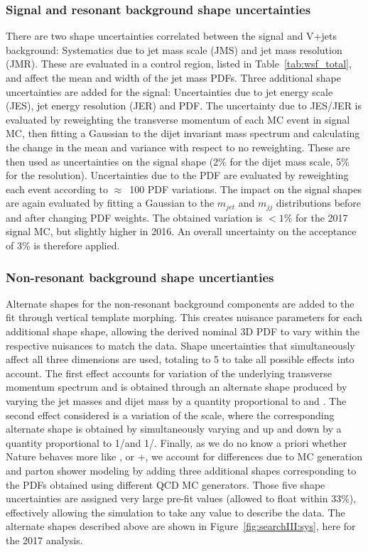 \subsubsection{Signal and resonant background shape uncertainties}
There are two shape uncertainties correlated between the signal and V+jets background: Systematics due to jet mass scale (JMS) and jet mass resolution (JMR). These are evaluated in a \ttbar control region, listed in Table~\ref{tab:wsf_total}, and affect the mean and width of the jet mass PDFs. 
Three additional shape uncertainties are added for the signal: Uncertainties due to jet energy scale (JES), jet energy resolution (JER) and PDF. The uncertainty due to JES/JER is evaluated by reweighting the transverse momentum of each MC event in signal MC, then fitting a Gaussian to the dijet invariant mass spectrum and calculating the change in the mean and variance with respect to no reweighting. These are then used as uncertainties on the signal \MVV shape (2\% for the dijet mass scale, 5\% for the resolution).\newline
Uncertainties due to the PDF are evaluated by reweighting each event according to $\approx$~100 PDF variations. The impact on the signal shapes are again evaluated by fitting a Gaussian to the $m_{jet}$ and $m_{jj}$ distributions before and after changing PDF weights. The obtained variation is $<1\%$ for the 2017 signal MC, but slightly higher in 2016. An overall uncertainty on the acceptance of 3\% is therefore applied. 


\subsubsection{Non-resonant background shape uncertianties}
Alternate shapes for the non-resonant background components are added to the fit through vertical template morphing. This creates nuisance parameters for each additional shape shape, allowing the derived nominal 3D PDF to vary within the respective nuisances to match the data. Shape uncertainties that simultaneously affect all three dimensions are used, totaling to 5 to take all possible effects into account. The first effect accounts for variation of the underlying transverse momentum spectrum and is obtained through an alternate shape produced by varying the jet masses \MJ and dijet mass \MVV by a quantity proportional to \MVV and \MJ. The second effect considered is a variation of the scale, where the corresponding alternate shape is obtained by simultaneously varying \MJ and \MVV up and down by a quantity proportional to 1/\MVV and 1/\MJ.
Finally, as we do no know a priori whether Nature behaves more like , \HERWIG{++} or \MADGRAPH{}+, we account for differences due to MC generation and parton shower modeling by adding three additional shapes corresponding to the PDFs obtained using different QCD MC generators.\newline
Those five shape uncertainties are assigned very large pre-fit values (allowed to float within 33\%), effectively allowing the simulation to take any value to describe the data. The alternate shapes described above are shown in Figure~\ref{fig:searchIII:sys}, here for the 2017 analysis.

